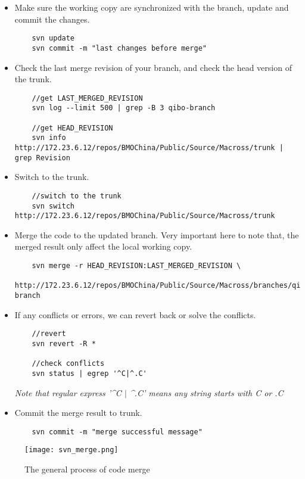 \documentclass{article}
\begin{document}
\begin{itemize}
\item 
	Make sure the working copy are synchronized with the branch, update and commit the changes.
	\begin{lstlisting}
	svn update 
	svn commit -m "last changes before merge"
	\end{lstlisting}

\item 
	Check the last merge revision of your branch, and check the head version of the trunk.
	\begin{lstlisting}
	//get LAST_MERGED_REVISION
	svn log --limit 500 | grep -B 3 qibo-branch
	
	//get HEAD_REVISION 											  
	svn info http://172.23.6.12/repos/BMOChina/Public/Source/Macross/trunk | grep Revision  
	\end{lstlisting}

\item
	Switch to the trunk.
	\begin{lstlisting}
	//switch to the trunk
	svn switch http://172.23.6.12/repos/BMOChina/Public/Source/Macross/trunk	
	\end{lstlisting}

\item
	Merge the code to the updated branch. Very important here to note that, the merged result only affect the local working copy.
	\begin{lstlisting}
	svn merge -r HEAD_REVISION:LAST_MERGED_REVISION \
	  http://172.23.6.12/repos/BMOChina/Public/Source/Macross/branches/qibo-branch
	\end{lstlisting}

\item
	If any conflicts or errors, we can revert back or solve the conflicts.
	\begin{lstlisting}
	//revert	
	svn revert -R *
	
	//check conflicts
	svn status | egrep '^C|^.C'
	\end{lstlisting}
	\textit{Note that regular express '\^{}C $\vert$ \^{}.C' means any string starts with C or .C}

\item
	Commit the merge result to trunk.
	\begin{lstlisting}
	svn commit -m "merge successful message"
	\end{lstlisting}
\end{itemize}

\begin{figure}[h]
\label{fig:fig_merge}
\begin{center}
\texttt{[image: svn\_merge.png]}
\caption{The general process of code merge}
\end{center}
\end{figure}	
\end{document}
